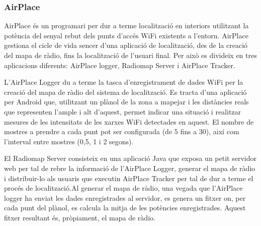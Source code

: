 \subsubsection{AirPlace}

AirPlace \cite{laoudias} és un programari per dur a terme localització en interiors utilitzant la potència del senyal rebut dels punts d'accés WiFi existents a l'entorn. AirPlace gestiona el cicle de vida sencer d'una aplicació de localització, des de la creació del mapa de ràdio, fins la localització de l'usuari final. Per això es divideix en tres aplicacions diferents: AirPlace logger, Radiomap Server i AirPlace Tracker.

L'AirPlace Logger du a terme la tasca d'enregistrament de dades WiFi per la creació del mapa de ràdio del sistema de localització. Es tracta d'una aplicació per Android que, utilitzant un plànol de la zona a mapejar i les distàncies reals que representen l'ample i alt d'aquest, permet indicar una situació i realitzar mesures de les intensitats de les xarxes WiFi detectades en aquest. El nombre de mostres a prendre a cada punt pot ser configurada (de 5 fins a 30), així com l'interval entre mostres (0,5, 1 i 2 segons).

El Radiomap Server consisteix en una aplicació Java que exposa un petit servidor web per tal de rebre la informació de l'AirPlace Logger, generar el mapa de ràdio i distribuir-lo als usuaris que executin AirPlace Tracker per tal de dur a terme el procés de localització.Al generar el mapa de ràdio, una vegada que l'AirPlace logger ha enviat les dades enregistrades al servidor, es genera un fitxer on, per cada punt del plànol, es calcula la mitja de les potències enregistrades. Aquest fitxer resultant és, pròpiament, el mapa de ràdio.

